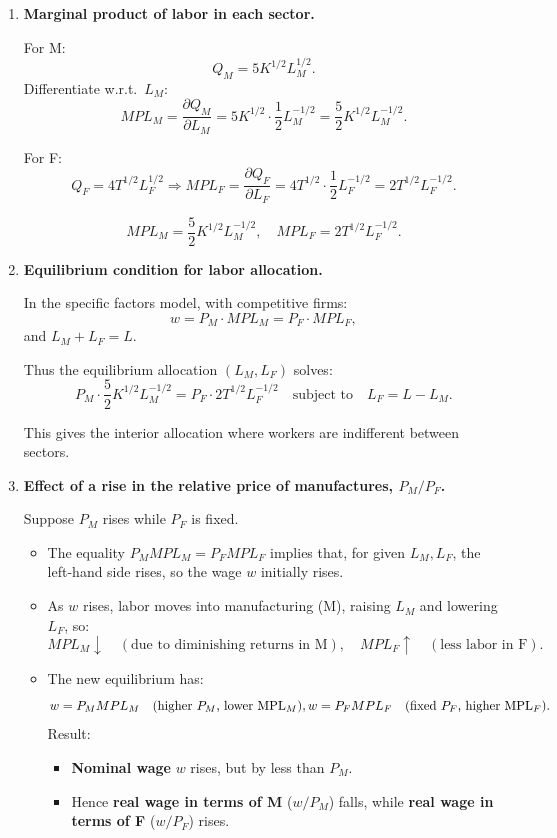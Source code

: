 \documentclass[12pt]{article}
\begin{document}
\begin{enumerate}[label=(\arabic*)]

\item \textbf{Marginal product of labor in each sector.}

For M:
\[
Q_M = 5K^{1/2}L_M^{1/2}.
\]
Differentiate w.r.t.\ $L_M$:
\[
MPL_M = \frac{\partial Q_M}{\partial L_M}
       = 5K^{1/2} \cdot \frac{1}{2}L_M^{-1/2}
       = \frac{5}{2}K^{1/2}L_M^{-1/2}.
\]

For F:
\[
Q_F = 4T^{1/2}L_F^{1/2}
\Rightarrow MPL_F = \frac{\partial Q_F}{\partial L_F}
       = 4T^{1/2}\cdot\frac{1}{2}L_F^{-1/2}
       = 2T^{1/2}L_F^{-1/2}.
\]

\[
\boxed{MPL_M = \frac{5}{2}K^{1/2}L_M^{-1/2},\quad MPL_F = 2T^{1/2}L_F^{-1/2}.}
\]

\item \textbf{Equilibrium condition for labor allocation.}

In the specific factors model, with competitive firms:
\[
w = P_M \cdot MPL_M = P_F \cdot MPL_F,
\]
and $L_M + L_F = L$.

Thus the equilibrium allocation $(L_M,L_F)$ solves:
\[
P_M \cdot \frac{5}{2}K^{1/2}L_M^{-1/2}
=
P_F \cdot 2T^{1/2}L_F^{-1/2}
\quad \text{subject to} \quad L_F = L - L_M.
\]

This gives the interior allocation where workers are indifferent between sectors.

\item \textbf{Effect of a rise in the relative price of manufactures, $P_M/P_F$.}

Suppose $P_M$ rises while $P_F$ is fixed.

\begin{itemize}
\item The equality $P_M MPL_M = P_F MPL_F$ implies that, for given $L_M,L_F$, the left-hand side rises, so the wage $w$ initially rises.
\item As $w$ rises, labor moves into manufacturing (M), raising $L_M$ and lowering $L_F$, so:
\[
MPL_M \downarrow \quad (\text{due to diminishing returns in M}),
\quad
MPL_F \uparrow \quad (\text{less labor in F}).
\]
\item The new equilibrium has:
\[
w = P_M MPL_M \quad \text{(higher $P_M$, lower MPL$_M$)}, \\
w = P_F MPL_F \quad \text{(fixed $P_F$, higher MPL$_F$)}.
\]
Result:
\begin{itemize}
\item \textbf{Nominal wage} $w$ rises, but by less than $P_M$.
\item Hence \textbf{real wage in terms of M} ($w/P_M$) falls, while \textbf{real wage in terms of F} ($w/P_F$) rises.
\end{itemize}
\end{itemize}


\end{enumerate}
\end{document}
